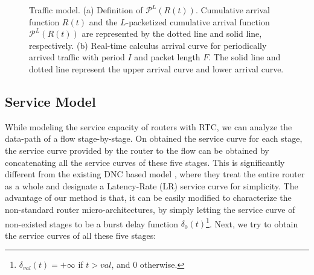 \documentclass[10pt,journal]{IEEEtran}
\begin{document}
\begin{figure}
  \caption{Traffic model. (a) Definition of $\mathcal{P}^L(R(t))$. Cumulative arrival function $R(t)$ and the $L$-packetized cumulative arrival function $\mathcal{P}^L(R(t))$ are represented by the dotted line and solid line, respectively. (b) Real-time calculus arrival curve for periodically arrived traffic with period $I$ and packet length $F$. The solid line and dotted line represent the upper arrival curve and lower arrival curve.}\label{ac}
\end{figure}

\subsection{Service Model}\label{router}
While modeling the service capacity of routers with RTC, we can analyze the data-path of a flow stage-by-stage. On obtained the service curve for each stage, the service curve provided by the router to the flow can be obtained by concatenating all the service curves of these five stages. This is significantly different from the existing DNC based model \cite{qian2009analysis,Qian489900}, where they treat the entire router as a whole and designate a Latency-Rate (LR) service curve \cite{Boudec2001Network} for simplicity. The advantage of our method is that, it can be easily modified to characterize the non-standard router micro-architectures, by simply letting the service curve of non-existed stages to be a burst delay function $\delta_0(t)$\footnote{$\delta_{val}(t)=+\infty$ if $t>val$, and 0 otherwise.}. Next, we try to obtain the service curves of all these five stages:
\end{document}
